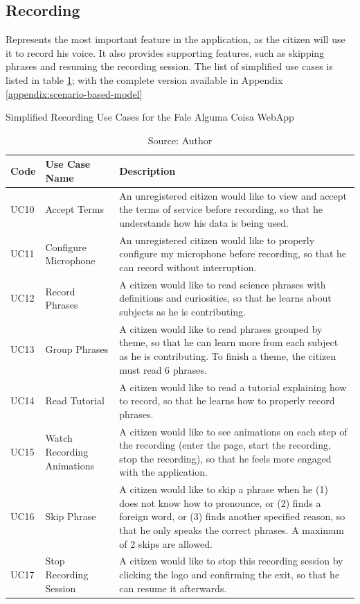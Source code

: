 \clearpage
\subsection{Recording}

Represents the most important feature in the application, as the citizen will use it to record his voice. It also provides supporting features, such as skipping phrases and resuming the recording session. The list of simplified use cases is listed in table \ref{tab:falealgumacoisa-simplified-recording}; with the complete version available in Appendix \ref{appendix:scenario-based-model}

\begin{table}[h]
\caption{Simplified Recording Use Cases for the Fale Alguma Coisa WebApp}
\label{tab:falealgumacoisa-simplified-recording}
\centering
\begin{tabular}{|p{1cm}|p{3cm}|p{10cm}|}
\hline
    Code & Use Case Name & Description \\ \hline
    UC10 & Accept Terms & An unregistered citizen would like to view and accept the terms of service before recording, so that he understands how his data is being used. \\ \hline
    UC11 & Configure Microphone & An unregistered citizen would like to properly configure my microphone before recording, so that he can record without interruption. \\ \hline
    UC12 & Record Phrases & A citizen would like to read science phrases with definitions and curiosities, so that he learns about subjects as he is contributing. \\ \hline
    UC13 & Group Phrases & A citizen would like to read phrases grouped by theme, so that he can learn more from each subject as he is contributing. To finish a theme, the citizen must read 6 phrases. \\ \hline
    UC14 & Read Tutorial & A citizen would like to read a tutorial explaining how to record, so that he learns how to properly record phrases. \\ \hline
    UC15 & Watch Recording Animations & A citizen would like to see animations on each step of the recording (enter the page, start the recording, stop the recording), so that he feels more engaged with the application. \\ \hline
    UC16 & Skip Phrase & A citizen would like to skip a phrase when he (1) does not know how to pronounce, or (2) finds a foreign word, or (3) finds another specified reason, so that he only speaks the correct phrases. A maximum of 2 skips are allowed. \\ \hline
    UC17 & Stop Recording Session & A citizen would like to stop this recording session by clicking the logo and confirming the exit, so that he can resume it afterwards. \\ \hline
\end{tabular}
\caption*{Source: Author}
\end{table}

